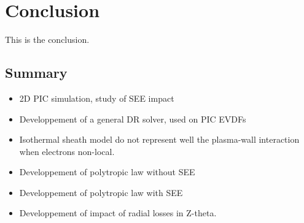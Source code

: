 
\chapter{Conclusion}
\label{ch-conclusion}


This is the conclusion.


\section{Summary}

\begin{itemize}
  \item 2D PIC simulation, study of SEE impact
  \item Developpement of a general DR solver, used on PIC EVDFs
  \item Isothermal sheath model do not represent well the plasma-wall interaction when electrons non-local.
  \item Developpement of polytropic law without SEE
  \item Developpement of polytropic law with SEE
  \item Developpement of impact of radial losses in Z-theta.
\end{itemize}

